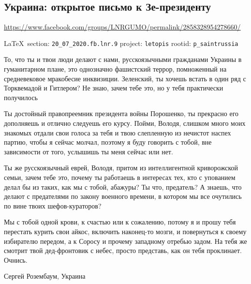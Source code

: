  
 
\subsection{Украина: открытое письмо к Зе-президенту}
\url{https://www.facebook.com/groups/LNRGUMO/permalink/2858328954278660/}
  
\vspace{0.5cm}
{\small\LaTeX~section: \verb|20_07_2020.fb.lnr.9| project: \verb|letopis| rootid: \verb|p_saintrussia|}
\vspace{0.5cm}


То, что ты и твои люди делают с нами, русскоязычными гражданами Украины в
гуманитарном плане, это однозначно фашистский террор, помноженный на
средневековое мракобесие инквизиции. Зеленский, ты хочешь встать в один ряд с
Торквемадой и Гитлером? Не знаю, зачем тебе это, но у тебя практически
получилось

Ты достойный правопреемник президента войны Порошенко, ты прекрасно его
дополняешь и отлично следуешь его курсу. Пойми, Володя, слишком много моих
знакомых отдали свои голоса за тебя и твою слепленную из нечистот наспех
партию, чтобы я сейчас молчал, поэтому я буду говорить с тобой, вне зависимости
от того, услышишь ты меня сейчас или нет.

Ты же русскоязычный еврей, Володя, притом из интеллигентной криворожской семьи,
зачем тебе это, почему ты работаешь в интересах тех, кто с упованием делал бы
из таких, как мы с тобой, абажуры? Ты что, предатель? А знаешь, что делают с
предателями по закону военного времени, в котором мы все очутились по вине
твоих шефов-кураторов?

Мы с тобой одной крови, к счастью или к сожалению, потому я и прошу тебя
перестать курить свои айкос, включить наконец-то мозги, и повернуться к своему
избирателю передом, а к Соросу и прочему западному отребью задом. На тебя же
смотрит твой дед-фронтовик с небес, просто представь, как он тебя проклинает.
Очнись.

Сергей Розембаум, Украина
  

